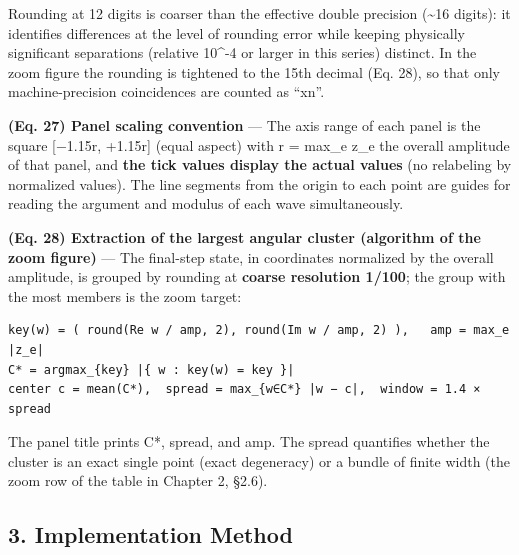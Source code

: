 \documentclass[
  a4paper,
]{ltjsarticle}
\begin{document}
Rounding at 12 digits is coarser than the effective double precision
(\textasciitilde16 digits): it identifies differences at the level of
rounding error while keeping physically significant separations
(relative 10\^{}-4 or larger in this series) distinct. In the zoom
figure the rounding is tightened to the 15th decimal (Eq. 28), so that
only machine-precision coincidences are counted as ``xn''.

\textbf{(Eq. 27) Panel scaling convention} --- The axis range of each
panel is the square {[}−1.15r, +1.15r{]} (equal aspect) with r = max\_e
\textbar z\_e\textbar{} the overall amplitude of that panel, and
\textbf{the tick values display the actual values} (no relabeling by
normalized values). The line segments from the origin to each point are
guides for reading the argument and modulus of each wave simultaneously.

\textbf{(Eq. 28) Extraction of the largest angular cluster (algorithm of
the zoom figure)} --- The final-step state, in coordinates normalized by
the overall amplitude, is grouped by rounding at \textbf{coarse
resolution 1/100}; the group with the most members is the zoom target:

\begin{verbatim}
key(w) = ( round(Re w / amp, 2), round(Im w / amp, 2) ),   amp = max_e |z_e|
C* = argmax_{key} |{ w : key(w) = key }|
center c = mean(C*),  spread = max_{w∈C*} |w − c|,  window = 1.4 × spread
\end{verbatim}

The panel title prints \textbar C*\textbar, spread, and amp. The spread
quantifies whether the cluster is an exact single point (exact
degeneracy) or a bundle of finite width (the zoom row of the table in
Chapter 2, §2.6).

\subsection{3. Implementation Method}\label{implementation-method}
\end{document}
